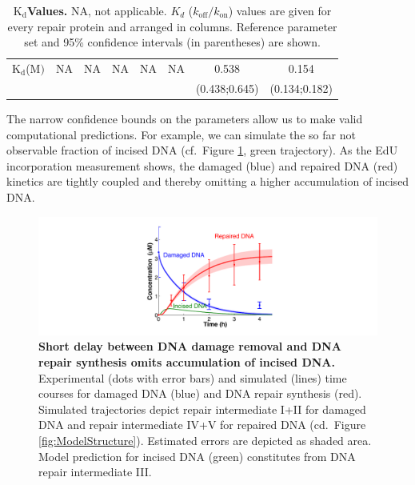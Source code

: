 \begin{landscape}
\begin{table}[t]
\begin{adjustwidth}{}{}
{\begin{tabular}[angle=90]{p{2cm}ccccccc}
	$\text{K}_{\text{d}}$({\textmu}$\text{M})$                                                  & NA                          &NA                         & NA                      &NA                      &NA                         &0.538                    &0.154     \\
	&                               &                              &                           &                          &                            &  (0.438;0.645)  & (0.134;0.182)  \\
	\hline
\end{tabular}}
\captionsetup{width=1.24\textwidth}
\caption{\textbf{$\text{K}_{\text{d}}$Values.} NA, not applicable. $K_d$ ($k_{\text{off}}/k_{\text{on}}$) values are given for every repair protein and arranged in columns. Reference parameter set and 95\% confidence intervals (in parentheses) are shown.}\label{tab:KdValues}
\end{adjustwidth}
\end{table}

\end{landscape}

The narrow confidence bounds on the parameters allow us to make valid computational predictions. For example, we can simulate the so far not observable fraction of incised DNA (cf.\ Figure \ref{fig:ModelFit_intermed}, green trajectory). As the EdU incorporation measurement shows, the damaged (blue) and repaired DNA (red) kinetics are tightly coupled and thereby omitting a higher accumulation of incised DNA. 

\begin{figure}[htbp]
	\begin{center}
		\includegraphics[width=1\textwidth]{Abbildungen/figure2_7.pdf}
		\caption{\textbf{Short delay between DNA damage removal and DNA repair synthesis omits accumulation of incised DNA.} Experimental (dots with error bars) and simulated (lines) time courses for damaged DNA (blue) and DNA repair synthesis (red). Simulated trajectories depict repair intermediate I+II for damaged DNA and repair intermediate IV+V for repaired DNA (cd.\ Figure \ref{fig:ModelStructure}). Estimated errors are depicted as shaded area. Model prediction for incised DNA (green) constitutes from DNA repair intermediate III. }
		\label{fig:ModelFit_intermed}
	\end{center}
\end{figure}


  